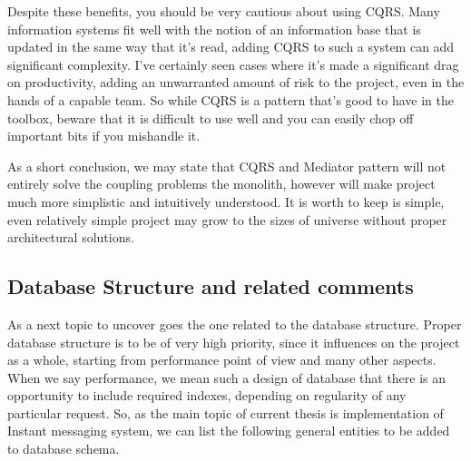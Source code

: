 Despite these benefits, you should be very cautious about using CQRS\@.
Many information systems fit well with the notion of an information base that is updated in the same way that it's read,
adding CQRS to such a system can add significant complexity.
I've certainly seen cases where it's made a significant drag on productivity, adding an unwarranted amount of risk to the
project, even in the hands of a capable team.
So while CQRS is a pattern that's good to have in the toolbox, beware that it is difficult to use well and you can easily
chop off important bits if you mishandle it.

As a short conclusion, we may state that CQRS and Mediator pattern will not entirely solve the coupling problems the monolith,
however will make project much more simplistic and intuitively understood.
It is worth to keep is simple,
even relatively simple project may grow to the sizes of universe without proper architectural solutions.

\subsection{Database Structure and related comments}\label{subsec:database-structure-and-related-comments}
As a next topic to uncover goes the one related to the database structure.
Proper database structure is to be of very high priority, since it influences on the project as a whole,
starting from performance point of view and many other aspects.
When we say performance, we mean such a design of database that there is an opportunity to include required indexes,
depending on regularity of any particular request.
So, as the main topic of current thesis is implementation of Instant messaging system, we can list the following
general entities to be added to database schema.

